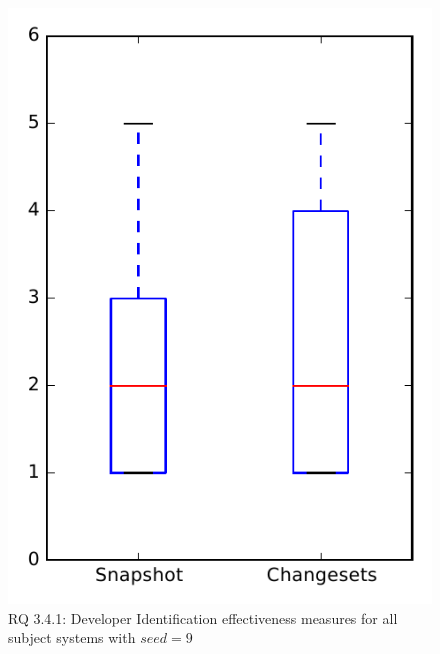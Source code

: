
\begin{figure}
\centering
\includegraphics[height=0.4\textheight]{figures/dit_seed/rq1_overview_9}
\caption{RQ 3.4.1: Developer Identification effectiveness measures for all subject systems with $seed=9$}
\label{fig:dit_seed:rq1:overview}
\end{figure}
